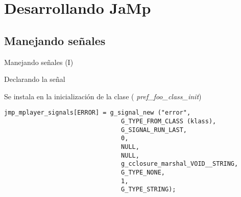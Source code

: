 \documentclass{beamer}
\begin{document}
\section{Desarrollando JaMp}
%
%
%
%


\subsection{Manejando señales}

\begin{frame}[fragile]{Manejando señales (I)}
\begin{block}{Declarando la señal}

\small{Se instala en la inicialización de la clase ({\it
pref\_foo\_class\_init})}

\scriptsize{
\begin{verbatim}
jmp_mplayer_signals[ERROR] = g_signal_new ("error",
                                G_TYPE_FROM_CLASS (klass),
                                G_SIGNAL_RUN_LAST,
                                0,
                                NULL,
                                NULL,
                                g_cclosure_marshal_VOID__STRING,
                                G_TYPE_NONE,
                                1,
                                G_TYPE_STRING);
\end{verbatim}
}
\end{block}
\end{frame}
\end{document}
